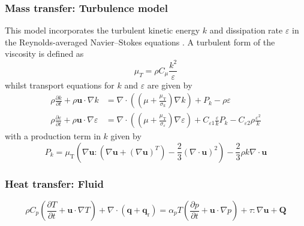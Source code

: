 \subsubsection{Mass transfer: Turbulence model}
This model incorporates the turbulent kinetic energy $k$ and dissipation rate $\varepsilon$ in the Reynolds-averaged Navier--Stokes equations \cite{comsol_cfd_2020}. A turbulent form of the viscosity is defined as
\begin{equation}
    \mu_{T}=\rho C_{\mu} \frac{k^{2}}{\varepsilon}
\end{equation}
whilst transport equations for $k$ and $\varepsilon$ are given by
\begin{align}
    \rho \frac{\partial k}{\partial t}+\rho \mathbf{u} \cdot \nabla k &= \nabla \cdot\left(\left(\mu+\frac{\mu_{\mathrm{T}}}{\sigma_{k}}\right) \nabla k\right)+P_{k}-\rho \varepsilon \\
    \rho \frac{\partial \varepsilon}{\partial t}+\rho \mathbf{u} \cdot \nabla \varepsilon &= \nabla \cdot\left(\left(\mu+\frac{\mu_{\mathrm{T}}}{\sigma_{\varepsilon}}\right) \nabla \varepsilon\right)+C_{\varepsilon 1} \frac{\varepsilon}{k} P_{k}-C_{\varepsilon 2} \rho \frac{\varepsilon^{2}}{k}
\end{align}
with a production term in $k$ given by
\begin{equation}
    P_{k}=\mu_{\mathrm{T}}\left(\nabla \mathbf{u}:\left(\nabla \mathbf{u}+(\nabla \mathbf{u})^{T}\right)-\frac{2}{3}(\nabla \cdot \mathbf{u})^{2}\right)-\frac{2}{3} \rho k \nabla \cdot \mathbf{u}
\end{equation}

\subsubsection{Heat transfer: Fluid}
\cite{comsol_heat_2020}
\begin{equation}
    \rho C_{p}\left(\frac{\partial T}{\partial t}+\mathbf{u} \cdot \nabla T\right)+\nabla \cdot\left(\mathbf{q}+\mathbf{q}_{\mathrm{r}}\right)=\alpha_{p} T\left(\frac{\partial p}{\partial t}+\mathbf{u} \cdot \nabla p\right)+\tau: \nabla \mathbf{u}+\mathbf{Q}
\end{equation}

